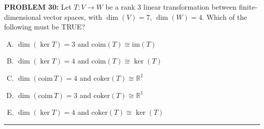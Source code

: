 \documentclass[12pt]{amsart}
\newcommand{\divider}{
  \vspace{-1em} %
  \noindent
  \raisebox{-0.15ex}{\textbullet}%
  \hspace{0.5em}%
  \rule[0.5ex]{0.95\textwidth}{1.0pt}%
  \hspace{0.5em}%
  \raisebox{-0.15ex}{\textbullet}%
  \vspace{0em} %
}
\begin{document}
{\bf PROBLEM 30:}
%
Let $T: V \to W$ be a rank 3 linear transformation between finite-dimensional vector 
spaces, with $\dim(V) = 7$, $\dim(W) = 4$. 
Which of the following must be TRUE?
\begin{enumerate}[(A)]
\item $\dim(\ker T) = 3$ and $\mathrm{coim}(T) \cong \mathrm{im}(T)$
\item $\dim(\ker T) = 4$ and $\mathrm{coim}(T) \cong \ker(T)$
\item $\dim(\mathrm{coim}\, T) = 4$ and $\mathrm{coker}(T) \cong \mathbb{R}^1$
\item $\dim(\mathrm{coim}\, T) = 3$ and $\mathrm{coker}(T) \cong \mathbb{R}^1$
\item $\dim(\ker T) = 4$ and $\mathrm{coker}(T) \cong \ker(T)$
\end{enumerate}
%
%
%
\divider
\end{document}
